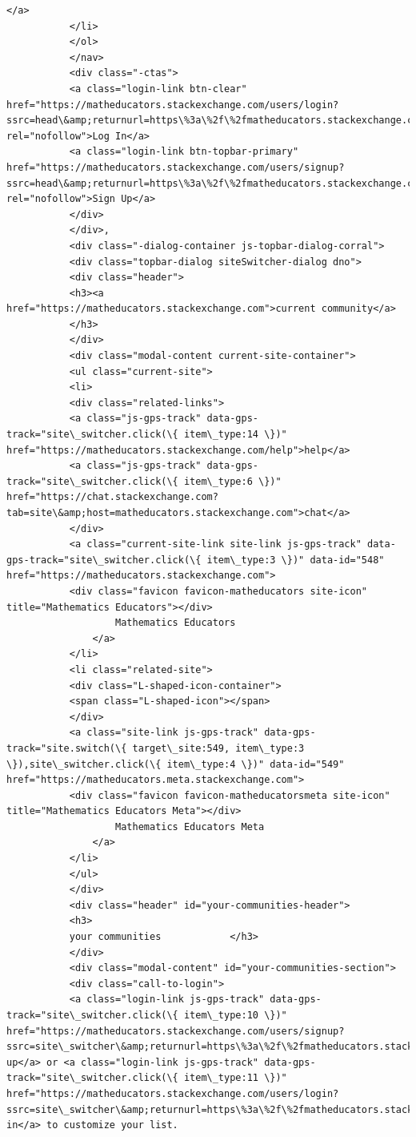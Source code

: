 \documentclass[11pt]{article}
\begin{document}
\begin{Verbatim}[commandchars=\\\{\}]
           </a>
           </li>
           </ol>
           </nav>
           <div class="-ctas">
           <a class="login-link btn-clear" href="https://matheducators.stackexchange.com/users/login?ssrc=head\&amp;returnurl=https\%3a\%2f\%2fmatheducators.stackexchange.com\%2f" rel="nofollow">Log In</a>
           <a class="login-link btn-topbar-primary" href="https://matheducators.stackexchange.com/users/signup?ssrc=head\&amp;returnurl=https\%3a\%2f\%2fmatheducators.stackexchange.com\%2f" rel="nofollow">Sign Up</a>
           </div>
           </div>,
           <div class="-dialog-container js-topbar-dialog-corral">
           <div class="topbar-dialog siteSwitcher-dialog dno">
           <div class="header">
           <h3><a href="https://matheducators.stackexchange.com">current community</a>
           </h3>
           </div>
           <div class="modal-content current-site-container">
           <ul class="current-site">
           <li>
           <div class="related-links">
           <a class="js-gps-track" data-gps-track="site\_switcher.click(\{ item\_type:14 \})" href="https://matheducators.stackexchange.com/help">help</a>
           <a class="js-gps-track" data-gps-track="site\_switcher.click(\{ item\_type:6 \})" href="https://chat.stackexchange.com?tab=site\&amp;host=matheducators.stackexchange.com">chat</a>
           </div>
           <a class="current-site-link site-link js-gps-track" data-gps-track="site\_switcher.click(\{ item\_type:3 \})" data-id="548" href="https://matheducators.stackexchange.com">
           <div class="favicon favicon-matheducators site-icon" title="Mathematics Educators"></div>
                   Mathematics Educators
               </a>
           </li>
           <li class="related-site">
           <div class="L-shaped-icon-container">
           <span class="L-shaped-icon"></span>
           </div>
           <a class="site-link js-gps-track" data-gps-track="site.switch(\{ target\_site:549, item\_type:3 \}),site\_switcher.click(\{ item\_type:4 \})" data-id="549" href="https://matheducators.meta.stackexchange.com">
           <div class="favicon favicon-matheducatorsmeta site-icon" title="Mathematics Educators Meta"></div>
                   Mathematics Educators Meta
               </a>
           </li>
           </ul>
           </div>
           <div class="header" id="your-communities-header">
           <h3>
           your communities            </h3>
           </div>
           <div class="modal-content" id="your-communities-section">
           <div class="call-to-login">
           <a class="login-link js-gps-track" data-gps-track="site\_switcher.click(\{ item\_type:10 \})" href="https://matheducators.stackexchange.com/users/signup?ssrc=site\_switcher\&amp;returnurl=https\%3a\%2f\%2fmatheducators.stackexchange.com\%2f">Sign up</a> or <a class="login-link js-gps-track" data-gps-track="site\_switcher.click(\{ item\_type:11 \})" href="https://matheducators.stackexchange.com/users/login?ssrc=site\_switcher\&amp;returnurl=https\%3a\%2f\%2fmatheducators.stackexchange.com\%2f">log in</a> to customize your list.

\end{Verbatim}
\end{document}
